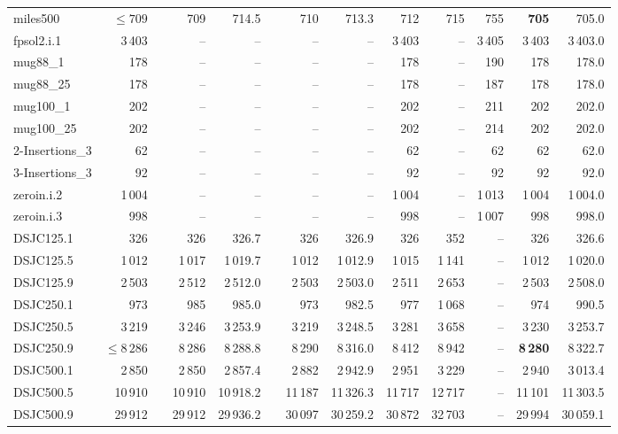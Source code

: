 \documentclass{elsart}
\begin{document}
\begin{table}
\begin{scriptsize}
\begin{tabular}{l@{ }r@{ }c@{ }rr@{ }c@{ }rrrrrrr}
miles500    &  $\le 709$ &&  709 & 714.5 && 710 & 713.3 & 712 &  715 & 755 & \textbf{705} & 705.0 \\
fpsol2.i.1    &3\,403  && -- & -- && --   & -- & 3\,403 &--&3\,405   &3\,403  & 3\,403.0  \\
mug88\_1  &178  && -- & -- && --   & -- & 178  &-- &190 &178  & 178.0    \\
mug88\_25  &178  && -- & -- && --   & -- & 178   &-- &187&178  & 178.0   \\
mug100\_1  &202  && -- & -- && --   & -- & 202  &--&211&202  & 202.0   \\
mug100\_25  & 202  & & -- & -- && --   & -- & 202  & --  & 214   & 202  & 202.0   \\
2-Insertions\_3 & 62   && -- & -- && --   & -- & 62  & --& 62 & 62   & 62.0  \\
3-Insertions\_3  &92  && -- & -- && --   & -- & 92  &-- &92 &92  & 92.0   \\
zeroin.i.2  &1\,004 && -- & -- && --   & -- & 1\,004   &-- &1\,013&1\,004  & 1\,004.0  \\
zeroin.i.3 &998  && -- & -- && --   & -- & 998  &--&1\,007 &998  & 998.0   \\
\hline
DSJC125.1   & 326  && 326 & 326.7  && 326  & 326.9 & 326& 352& -- &326  & 326.6 \\
DSJC125.5 & 1\,012   &&  1\,017  & 1\,019.7 && 1\,012 & 1\,012.9  &  1\,015 &  1\,141 &  --  & 1\,012 &  1\,020.0 \\
DSJC125.9    & 2\,503   && 2\,512 & 2\,512.0   && 2\,503  & 2\,503.0 & 2\,511  & 2\,653 & -- & 2\,503  & 2\,508.0 \\
DSJC250.1    & 973  && 985 & 985.0   && 973  & 982.5 & 977  & 1\,068 & --& 974  & 990.5 \\
DSJC250.5    &3\,219  && 3\,246 & 3\,253.9   &&3\,219  & 3\,248.5 & 3\,281&3\,658 & -- &  3\,230 & 3\,253.7   \\
DSJC250.9   & $\le 8\,286$  && 8\,286 & 8\,288.8  &&  8\,290  & 8\,316.0 & 8\,412&8\,942&-- &\textbf{8\,280} & 8\,322.7   \\

DSJC500.1    & 2\,850  && 2\,850 &  2\,857.4   &&  2\,882  & 2\,942.9 & 2\,951  & 3\,229 & --& 2\,940  & 3\,013.4 \\
DSJC500.5    &10\,910  &&10\,910 & 10\,918.2   &&11\,187  & 11\,326.3 & 11\,717 &12\,717 & -- &  11\,101 &  11\,303.5  \\
DSJC500.9   & 29\,912  &&29\,912 & 29\,936.2  &&  30\,097  &  30\,259.2 &30\,872 &32\,703 &-- &29\,994 & 30\,059.1  \\


\end{tabular}
\end{scriptsize}
\end{table}
\end{document}
